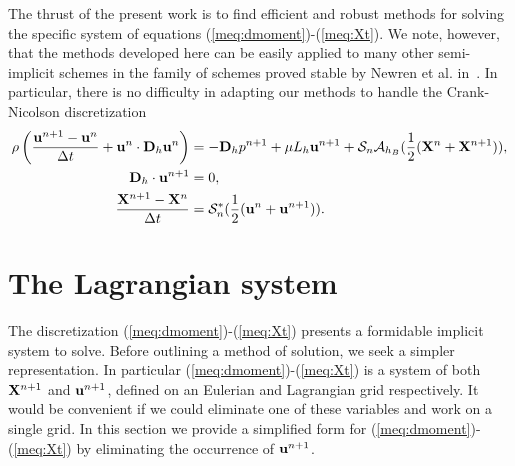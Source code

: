 The thrust of the present work is to find efficient and robust methods for solving the specific system of equations (\ref{meq:dmoment})-(\ref{meq:Xt}). We note, however, that the methods developed here can be easily applied to many other semi-implicit schemes in the family of schemes proved stable by Newren et al. in~\cite{NFGK2007}. In particular, there is no difficulty in adapting our methods to handle the Crank-Nicolson discretization
\begin{align}
\rho\left(\frac{\mathbf{u}^{n+1}-\mathbf{u}^n}{\Delta t} + \mathbf{u}^n\cdot\mathbf{D}_h\mathbf{u}^n\right) &= -\mathbf{D}_h p^{n+1}+ \mu L_h \mathbf{u}^{n+1} + \mathcal{S}_n\mathcal{A}_{h_B}(\frac{1}{2}(\mathbf{X}^n+\mathbf{X}^{n+1})), \label{meq:cr_dmoment} \\
\mathbf{D}_h \cdot \mathbf{u}^{n+1} &= 0, \label{meq:cr_ddivergence} \\
\frac{\mathbf{X}^{n+1}-\mathbf{X}^n}{\Delta t} &= \mathcal{S}^*_n(\frac{1}{2}(\mathbf{u}^n+\mathbf{u}^{n+1})). \label{meq:cr_Xt}
\end{align}

\section{The Lagrangian system}
\label{Sec:LagrangianSystem}
The discretization (\ref{meq:dmoment})-(\ref{meq:Xt}) presents a formidable implicit system to solve. Before outlining a method of solution,  we seek a simpler representation. In particular (\ref{meq:dmoment})-(\ref{meq:Xt}) is a system of both $\mathbf{X}^{n+1}$ and $\mathbf{u}^{n+1}$, defined on an Eulerian and Lagrangian grid respectively. It would be convenient if we could eliminate one of these variables and work on a single grid. In this section we provide a simplified form for (\ref{meq:dmoment})-(\ref{meq:Xt}) by eliminating the occurrence of $\mathbf{u}^{n+1}$.

